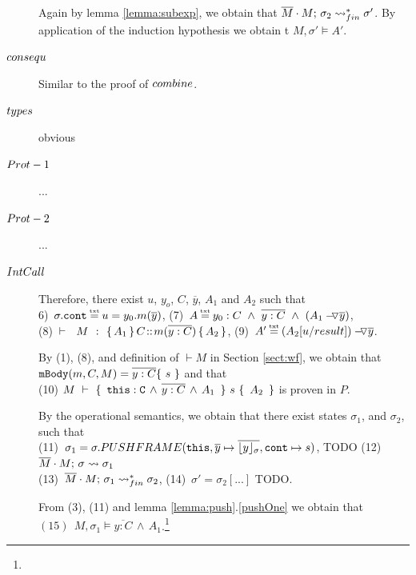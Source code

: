 \begin{description}
 
Again by lemma \ref{lemma:subexp}, we obtain that $\overline{M}\cdot M;\, {\sigma_2} \rightsquigarrow^*_{fin} \sigma'$.  
 By application of the induction hypothesis we obtain t $M, \sigma' \models A'$.

\item[${\sc{consequ}}$] Similar to the proof of  ${\sc{combine}}$. 

\item[${\sc{types}}$] obvious

\item[${\sc{Prot-1}}$] ...

\item[${\sc{Prot-2}}$] ...

\item[${\sc{IntCall}}$]

Therefore, there exist $u$, $y_o$, $C$, $\overline y$,  $A_1$ and $A_2$ such that \\
6)\ $\sigma.\prg{cont}\txteq u=y_0.m(\overline y)$,   \hspace{2cm}
 (7)\ $A \txteq y_0:C  \ \wedge\ \overline {y:C}\ \wedge \  (\PushAS  {y} {A_1})$, 
\\
 (8)\ ${\vdash \ \ M\ \ \mathbf{:}\ \  \{\, A_1\, \}\, C\!::\!m(\overline{y:C})\, \{\,   {A_2}\, \}  }$,    \hspace{1cm}
 (9)\ $A' \txteq  {\PushAS  {y} {(A_2[ u/result])}}$. 

By (1), (8), and definition of $\vdash M$ in Section \ref{sect:wf}, we obtain that   $\prg{mBody}(m,C,M)=\overline{y:C}\{\  s \ \}$ and that\\
(10)   ${M\ \vdash\ \{\, \ \mbox{\normalfont{\texttt{this}}}:\mbox{\normalfont{\texttt{C}}}\, \wedge\, \overline{y:C}\, \wedge\, A_1\  \, \} \ s\  \{\,\ A_2\ \, \} }$ is proven in $P$.
 
 By the operational semantics, we obtain that there exist states $\sigma_1$, and $\sigma_2$, such that \\
 (11)\ $\sigma_1=\sigma.PUSHFRAME(\mbox{\normalfont{\texttt{this}}}, {\overline y} \mapsto \overline{\lfloor y \rfloor_{\sigma}},\mbox{\normalfont{\texttt{cont}}} \mapsto s) $, TODO   \hspace{1cm}
   (12)\ $\overline{M}\cdot M;\, {\sigma} \rightsquigarrow \sigma_1$ \\
 (13)\ $\overline{M}\cdot M;\, {\sigma_1} \rightsquigarrow^*_{fin} \sigma_2$,   \hspace{3cm}
 (14)\ $\sigma'=\sigma_2[...]$ TODO.
 
 From (3), (11) and lemma \ref{lemma:push}.\ref{pushOne}  we obtain that \ \ \  $ (15) \ \ M, \sigma_1 \models \overline{y:C}\, \wedge\, A_1$.\footnote{}
 

\end{description}

